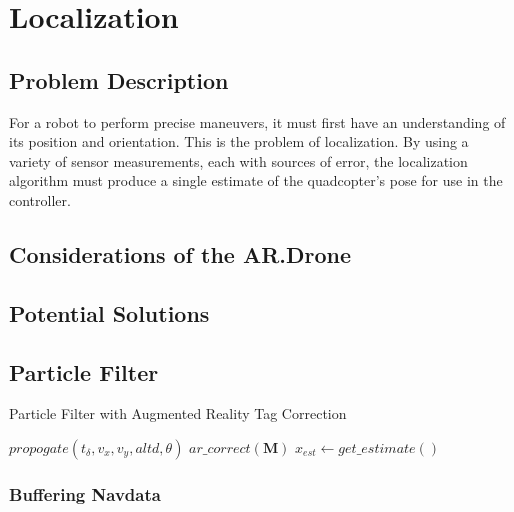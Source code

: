 
\chapter{Localization\label{ch:localization}}

\section{Problem Description}
For a robot to perform precise maneuvers, it must first have an understanding of its position and orientation. This is the problem of localization. By using a variety of sensor measurements, each with sources of error, the localization algorithm must produce a single estimate of the quadcopter's pose for use in the controller.  

\section{Considerations of the AR.Drone}

\section{Potential Solutions}

\section{Particle Filter}



	\begin{algorithm}
		\centering
		\caption{Particle Filter with Augmented Reality Tag Correction} 
		\begin{algorithmic}[1]
					\State $propogate(t_{\delta}, v_x, v_y, altd, \theta)$
				\EndIf
					\State $ar\_correct(\textbf{M})$ 
				\EndIf
				\State $x_{est} \gets get\_estimate()$
			\EndFor
		\end{algorithmic}
	\end{algorithm}

\subsection{Buffering Navdata}

